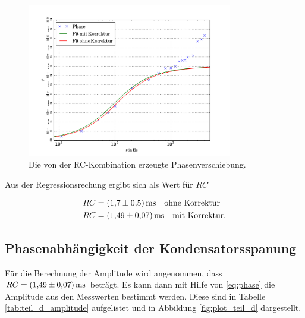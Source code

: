 \begin{figure}
  \centering
  \includegraphics[width=0.8\textwidth]{pics/frequenz_phase.pdf}
  \caption{Die von der RC-Kombination erzeugte Phasenverschiebung.}
  \label{fig:plot_teil_c}
\end{figure}


Aus der Regressionsrechung ergibt sich als Wert für $RC$

\begin{align}
  \label{eq:teil_c_rc}
  \begin{aligned}
    RC&=\SI{1.7\pm0.5}{\milli\second} \quad \text{ohne Korrektur} \\
    RC& =\SI{1.49\pm0.07}{\milli\second} \quad \text{mit Korrektur}.
\end{aligned}
\end{align}

\subsection{Phasenabhängigkeit der Kondensatorsspanung}

Für die Berechnung der Amplitude wird angenommen, dass $RC=\SI{1.49\pm0.07}{\milli\second}$ %
beträgt. Es kann dann mit Hilfe von \eqref{eq:phase} die Amplitude aus den Messwerten bestimmt werden. %
Diese sind in Tabelle \ref{tab:teil_d_amplitude} aufgelistet und in Abbildung \ref{fig:plot_teil_d} dargestellt.



